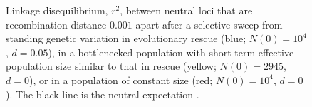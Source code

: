 \documentclass[]{article}
\begin{document}
\begin{figure}[htbp]
\begin{tikzpicture}
\end{tikzpicture}
\caption{
Linkage disequilibrium, $r^2$, between neutral loci that are recombination distance $0.001$ apart after a selective sweep from standing genetic variation in evolutionary rescue (blue; $N(0)=10^4$, $d=0.05$), in a bottlenecked population with short-term effective population size similar to that in rescue (yellow; $N(0)=2945$, $d=0$), or in a population of constant size (red; $N(0)=10^4$, $d=0$).
The black line is the neutral expectation \citep[equation 7.31 in][]{wakeley2009coalescent}. 
}%
\label{fig:rescueSGV_LD}
\end{figure}

\begin{figure}[htbp]
\centering
{}
\end{figure}
\end{document}
